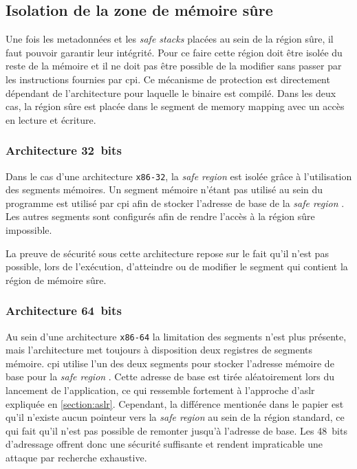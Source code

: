 \subsection{Isolation de la zone de mémoire sûre}

Une fois les metadonnées et les \og \textit{safe stacks} \fg placées au sein de la région sûre, il faut pouvoir garantir leur intégrité. Pour ce faire cette région doit être isolée du reste de la mémoire et il ne doit pas être possible de la modifier sans passer par les instructions fournies par \gls{cpi}. Ce mécanisme de protection est directement dépendant de l'architecture pour laquelle le binaire est compilé. Dans les deux cas, la région sûre est placée dans le segment de \og memory mapping \fg avec un accès en lecture et écriture.

\subsubsection{Architecture 32~bits}

Dans le cas d'une architecture \texttt{x86-32}, la \og \textit{safe region} \fg est isolée grâce à l'utilisation des segments mémoires. Un segment mémoire n'étant pas utilisé au sein du programme est utilisé par \gls{cpi} afin de stocker l'adresse de base de la \og \textit{safe region} \fg. Les autres segments sont configurés afin de rendre l'accès à la région sûre impossible.


La preuve de sécurité sous cette architecture repose sur le fait qu'il n'est pas possible, lors de l'exécution, d'atteindre ou de modifier le segment qui contient la région de mémoire sûre.

\subsubsection{Architecture 64~bits}

Au sein d'une architecture \texttt{x86-64} la limitation des segments n'est plus présente, mais l'architecture met toujours à disposition deux registres de segments mémoire. \gls{cpi} utilise l'un des deux segments pour stocker l'adresse mémoire de base pour la \og \textit{safe region} \fg. Cette adresse de base est tirée aléatoirement lors du lancement de l'application, ce qui ressemble fortement à l'approche d'\gls{aslr} expliquée en \autoref{section:aslr}. Cependant, la différence mentionée dans le papier est qu'il n'existe aucun pointeur vers la \og \textit{safe region} \fg au sein de la région standard, ce qui fait qu'il n'est pas possible de remonter jusqu'à l'adresse de base. Les 48~bits d'adressage offrent donc une sécurité suffisante et rendent impraticable une attaque par recherche exhaustive.

